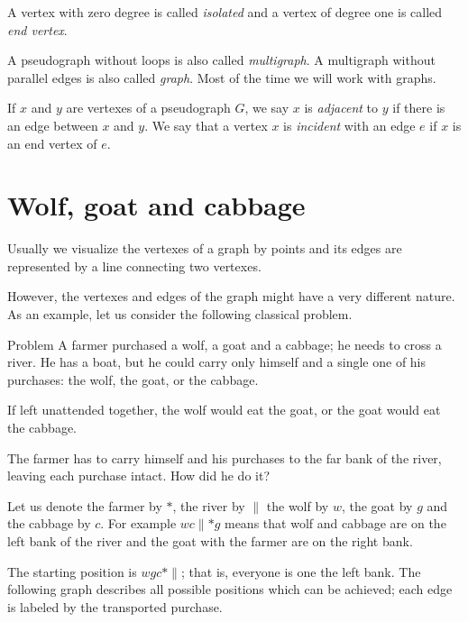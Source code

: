 A vertex with zero degree is called \emph{isolated} and a vertex of degree one is called \emph{end vertex}.

\smallskip

A pseudograph without loops is also called \emph{multigraph}.
A multigraph without parallel edges is also called \emph{graph}.
Most of the time we will work with graphs.

If $x$ and $y$ are vertexes of a pseudograph $G$, we say $x$ is \emph{adjacent} to $y$ if there is an edge between $x$ and $y$.
We say that a vertex $x$ is \emph{incident} with an edge $e$ if $x$ is an end vertex of $e$.

\section*{Wolf, goat and cabbage}

Usually we visualize the vertexes of a graph by points
and its edges are represented by a line connecting two vertexes.

However, the vertexes and edges of the graph might have a very different nature.
As an example, let us consider the following classical problem.

\begin{thm}{Problem}
A farmer purchased a wolf, a goat and a cabbage;
he needs to cross a river.
He has a boat, but he could carry only himself and a single one of his purchases: the wolf, the goat, or the cabbage.

If left unattended together, the wolf would eat the goat, or the goat would eat the cabbage.

The farmer has to carry himself and his purchases to the far bank of the river, leaving each purchase intact. How did he do it?
\end{thm}

Let us denote the farmer by $*$, the river by ${\parallel}$
the wolf by $w$, the goat by $g$ and the cabbage by $c$.
For example $wc{\parallel}{*}g$ means that wolf and cabbage are on the left bank of the river and the goat with the farmer are on the right bank.

The starting position is $wgc{*}{\parallel}$; that is, everyone is one the left bank.
The following graph describes all possible positions which can be achieved; each edge is labeled by the transported purchase.

